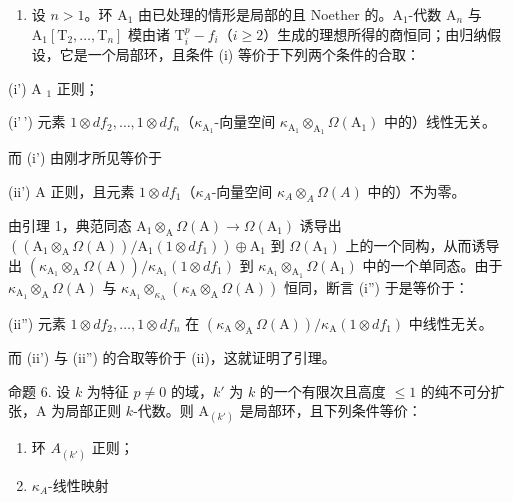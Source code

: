\begin{enumerate}
\def\labelenumi{\Alph{enumi})}
\setcounter{enumi}{1}
\tightlist
\item
  设 \(n > 1\)。环 \(\mathrm{A}_{1}\) 由已处理的情形是局部的且 Noether 的。\(\mathrm{A}_{1}\)-代数 \(\mathrm{A}_{n}\) 与 \(\mathrm{A}_{1}[\mathrm{T}_{2},\ldots ,\mathrm{T}_{n}]\) 模由诸 \(\mathrm{T}_i^p -f_i\)（\(i\geqslant 2\)）生成的理想所得的商恒同；由归纳假设，它是一个局部环，且条件 (i) 等价于下列两个条件的合取：
\end{enumerate}

(i') A \(_{1}\) 正则；

(i'\,') 元素 \(1 \otimes df_2, \ldots, 1 \otimes df_n\)（\(\kappa_{\mathrm{A}_1}\)-向量空间 \(\kappa_{\mathrm{A}_1} \otimes_{\mathrm{A}_1} \Omega(\mathrm{A}_1)\) 中的）线性无关。

而 (i') 由刚才所见等价于

(ii') A 正则，且元素 \(1 \otimes df_{1}\)（\(\kappa_{A}\)-向量空间 \(\kappa_{A} \otimes_{A} \Omega(A)\) 中的）不为零。

由引理 1，典范同态 \(\mathrm{A}_{1} \otimes_{\mathrm{A}} \Omega(\mathrm{A}) \to \Omega(\mathrm{A}_{1})\) 诱导出 \(((\mathrm{A}_{1} \otimes_{\mathrm{A}} \Omega(\mathrm{A})) / \mathrm{A}_{1}(1 \otimes df_{1})) \oplus \mathrm{A}_{1}\) 到 \(\Omega(\mathrm{A}_{1})\) 上的一个同构，从而诱导出 \((\kappa_{\mathrm{A}_{1}} \otimes_{\mathrm{A}} \Omega(\mathrm{A})) / \kappa_{\mathrm{A}_{1}}(1 \otimes df_{1})\) 到 \(\kappa_{\mathrm{A}_{1}} \otimes_{\mathrm{A}_{1}} \Omega(\mathrm{A}_{1})\) 中的一个单同态。由于 \(\kappa_{\mathrm{A}_{1}} \otimes_{\mathrm{A}} \Omega(\mathrm{A})\) 与 \(\kappa_{\mathrm{A}_{1}} \otimes_{\kappa_{\mathrm{A}}} (\kappa_{\mathrm{A}} \otimes_{\mathrm{A}} \Omega(\mathrm{A}))\) 恒同，断言 (i'') 于是等价于：

(ii'') 元素 \(1 \otimes df_2, \ldots, 1 \otimes df_n\) 在 \((\kappa_{\mathrm{A}} \otimes_{\mathrm{A}} \Omega(\mathrm{A})) / \kappa_{\mathrm{A}}(1 \otimes df_1)\) 中线性无关。

而 (ii') 与 (ii'') 的合取等价于 (ii)，这就证明了引理。

命题 6. 设 \(k\) 为特征 \(p \neq 0\) 的域，\(k'\) 为 \(k\) 的一个有限次且高度 \(\leqslant 1\) 的纯不可分扩张，A 为局部正则 \(k\)-代数。则 \(\mathrm{A}_{(k')}\) 是局部环，且下列条件等价：

\begin{enumerate}
\def\labelenumi{(\roman{enumi})}
\item
  环 \(A_{(k')}\) 正则；
\item
  \(\kappa_{A}\)-线性映射
\end{enumerate}


